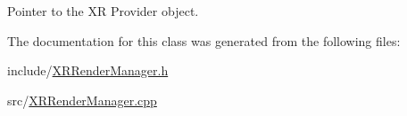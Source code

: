 Pointer to the XR Provider object. 



The documentation for this class was generated from the following files\+:\begin{DoxyCompactItemize}
\item 
include/\mbox{\hyperlink{_x_r_render_manager_8h}{X\+R\+Render\+Manager.\+h}}\item 
src/\mbox{\hyperlink{_x_r_render_manager_8cpp}{X\+R\+Render\+Manager.\+cpp}}\end{DoxyCompactItemize}
